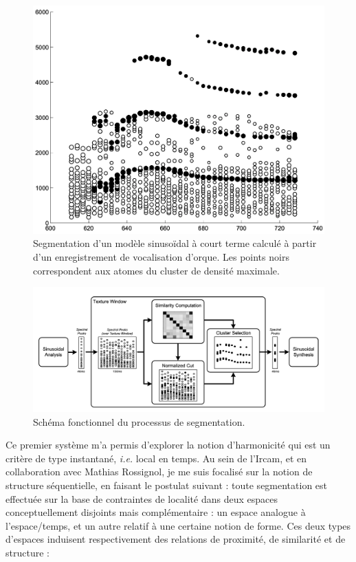   \begin{figure}[t]
          \includegraphics[width=1.2\textwidth]{figures/orcaSin.png}
         \caption{Segmentation d'un modèle sinusoïdal à court terme calculé à partir d'un enregistrement de vocalisation d'orque. Les points noirs correspondent aux atomes du cluster de densité maximale.}\label{fig:orca}
  \end{figure}

  \begin{figure}[t]
          \includegraphics[width=1.2\textwidth]{figures/ncutDiagram.png}
         \caption{Schéma fonctionnel du processus de segmentation.}\label{fig:ncut}
  \end{figure}

Ce premier système m'a permis d'explorer la notion d'harmonicité qui est un critère de type instantané, \textit{i.e.} local en temps.
Au sein de l'Ircam, et en collaboration avec Mathias Rossignol, je me suis focalisé sur la notion de structure séquentielle, en faisant le postulat suivant : toute segmentation est effectuée sur la base de contraintes de localité dans deux espaces conceptuellement disjoints mais complémentaire : un espace analogue à l'espace/temps, et un autre relatif à une certaine notion de forme. Ces deux types d'espaces induisent respectivement des relations de proximité, de similarité et de structure : %

